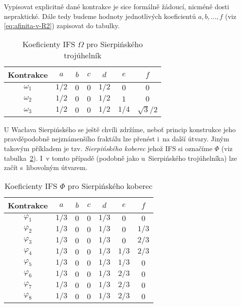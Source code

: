 Vypisovat explicitně dané kontrakce je sice formálně žádoucí, nicméně dosti nepraktické. Dále tedy budeme hodnoty jednotlivých koeficientů $a,b,\ldots,f$ (viz \eqref{eq:afinita-v-R2}) zapisovat do tabulky.
\begin{table}[h]
    \centering
    \begin{tabular}{c|cccccc}
    Kontrakce  & $a$   & $b$ & $c$ & $d$   & $e$   & $f$          \\\hline
    $\omega_1$ & $1/2$ & $0$ & $0$ & $1/2$ & $0$   & $0$          \\
    $\omega_2$ & $1/2$ & $0$ & $0$ & $1/2$ & $1$   & $0$          \\
    $\omega_3$ & $1/2$ & $0$ & $0$ & $1/2$ & $1/4$ & $\sqrt{3}/2$ \\
    \end{tabular}
    \caption{Koeficienty IFS $\Omega$ pro Sierpińského trojúhelník}
    \label{table:ifs-sierpinskeho-trojuhelnik}
\end{table}
U Wacłava Sierpińského se ještě chvíli zdržíme, neboť princip konstrukce jeho pravděpodobně nejznámenšího fraktálu lze přenést i~na další útvary. Jiným takovým příkladem je tzv. \emph{Sierpińského koberec} jehož IFS si označíme $\Phi$ (viz tabulka~\ref{table:ifs-sierpinskeho-koberec}). I~v tomto případě (podobně jako u~Sierpińského trojúhelníka) lze začít s~libovolným útvarem. 
\begin{table}[h]
    \centering
    \begin{tabular}{c|cccccc}
    Kontrakce  & $a$   & $b$ & $c$ & $d$   & $e$   & $f$          \\\hline
    $\varphi_1$ & $1/3$ & $0$ & $0$ & $1/3$ & $0$   & $0$         \\
    $\varphi_2$ & $1/3$ & $0$ & $0$ & $1/3$ & $0$   & $1/3$         \\
    $\varphi_3$ & $1/3$ & $0$ & $0$ & $1/3$ & $0$   & $2/3$         \\
    $\varphi_4$ & $1/3$ & $0$ & $0$ & $1/3$ & $1/3$   & $2/3$         \\
    $\varphi_5$ & $1/3$ & $0$ & $0$ & $1/3$ & $1/3$   & $0$         \\
    $\varphi_6$ & $1/3$ & $0$ & $0$ & $1/3$ & $2/3$   & $0$         \\
    $\varphi_7$ & $1/3$ & $0$ & $0$ & $1/3$ & $2/3$   & $0$         \\
    $\varphi_8$ & $1/3$ & $0$ & $0$ & $1/3$ & $2/3$   & $0$
    \end{tabular}
    \caption{Koeficienty IFS $\Phi$ pro Sierpińského koberec}
    \label{table:ifs-sierpinskeho-koberec}
\end{table}

